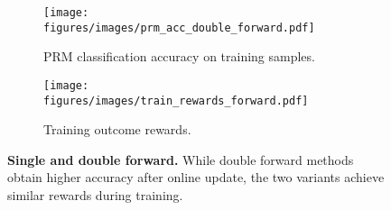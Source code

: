 \begin{figure*}[tbh]
    \centering
    \begin{subfigure}{0.48\textwidth}
        \centering
        \texttt{[image: figures/images/prm\_acc\_double\_forward.pdf]}
        \caption{PRM classification accuracy on training samples.} %
        \label{fig:prm_acc_double_forward}
    \end{subfigure}
    \hfill %
    \begin{subfigure}{0.48\textwidth}
        \centering
        \texttt{[image: figures/images/train\_rewards\_forward.pdf]}
        \caption{Training outcome rewards.} %
        \label{fig:train_double_forward}
    \end{subfigure}
    \caption{\textbf{Single and double forward.} While double forward methods obtain higher accuracy after online update, the two variants achieve similar rewards during training.} %
    \label{fig:single_double_forward}
\end{figure*}

